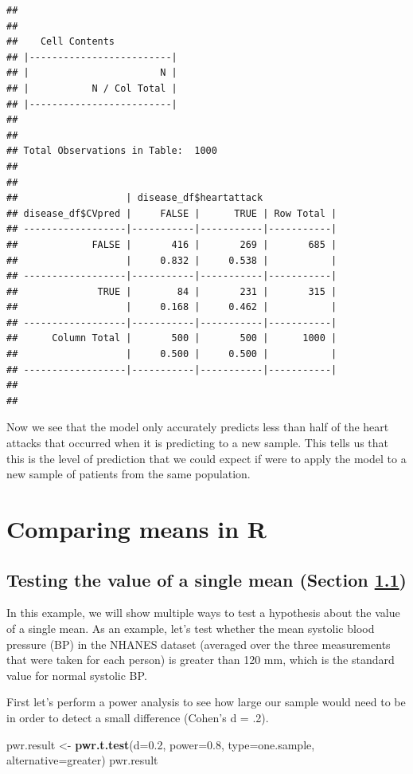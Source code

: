 \documentclass[
  12pt,
]{book}
\newenvironment{Shaded}{\begin{snugshade}}{\end{snugshade}}
\newcommand{\AttributeTok}[1]{\textcolor[rgb]{0.13,0.29,0.53}{#1}}
\newcommand{\FloatTok}[1]{\textcolor[rgb]{0.00,0.00,0.81}{#1}}
\newcommand{\FunctionTok}[1]{\textcolor[rgb]{0.13,0.29,0.53}{\textbf{#1}}}
\newcommand{\NormalTok}[1]{#1}
\newcommand{\OtherTok}[1]{\textcolor[rgb]{0.56,0.35,0.01}{#1}}
\newcommand{\StringTok}[1]{\textcolor[rgb]{0.31,0.60,0.02}{#1}}
\begin{document}
\begin{verbatim}
## 
##  
##    Cell Contents
## |-------------------------|
## |                       N |
## |           N / Col Total |
## |-------------------------|
## 
##  
## Total Observations in Table:  1000 
## 
##  
##                   | disease_df$heartattack 
## disease_df$CVpred |     FALSE |      TRUE | Row Total | 
## ------------------|-----------|-----------|-----------|
##             FALSE |       416 |       269 |       685 | 
##                   |     0.832 |     0.538 |           | 
## ------------------|-----------|-----------|-----------|
##              TRUE |        84 |       231 |       315 | 
##                   |     0.168 |     0.462 |           | 
## ------------------|-----------|-----------|-----------|
##      Column Total |       500 |       500 |      1000 | 
##                   |     0.500 |     0.500 |           | 
## ------------------|-----------|-----------|-----------|
## 
## 
\end{verbatim}

Now we see that the model only accurately predicts less than half of the heart attacks that occurred when it is predicting to a new sample. This tells us that this is the level of prediction that we could expect if were to apply the model to a new sample of patients from the same population.

\hypertarget{comparing-means-in-r}{%
\chapter{Comparing means in R}\label{comparing-means-in-r}}

\hypertarget{single-mean}{%
\section{Testing the value of a single mean (Section \ref{single-mean})}\label{single-mean}}

In this example, we will show multiple ways to test a hypothesis about the value of a single mean. As an example, let's test whether the mean systolic blood pressure (BP) in the NHANES dataset (averaged over the three measurements that were taken for each person) is greater than 120 mm, which is the standard value for normal systolic BP.

First let's perform a power analysis to see how large our sample would need to be in order to detect a small difference (Cohen's d = .2).

\begin{Shaded}
\begin{Highlighting}[]
\NormalTok{pwr.result }\OtherTok{\textless{}{-}} \FunctionTok{pwr.t.test}\NormalTok{(}\AttributeTok{d=}\FloatTok{0.2}\NormalTok{, }\AttributeTok{power=}\FloatTok{0.8}\NormalTok{, }
           \AttributeTok{type=}\StringTok{\textquotesingle{}one.sample\textquotesingle{}}\NormalTok{, }
           \AttributeTok{alternative=}\StringTok{\textquotesingle{}greater\textquotesingle{}}\NormalTok{)}
\NormalTok{pwr.result}
\end{Highlighting}
\end{Shaded}
\end{document}
